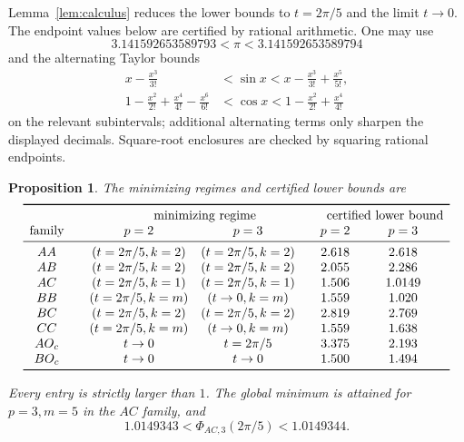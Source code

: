 \documentclass{amsart}
\newtheorem{prop}[lemma]{Proposition}
\newcommand{\tablegap}{\par\vspace{0.2cm}}
\begin{document}
Lemma~\ref{lem:calculus} reduces the lower bounds to \(t=2\pi/5\) and the
limit \(t\to0\).  The endpoint values below are certified by rational
arithmetic.  One may use
\[
 3.141592653589793<\pi<3.141592653589794
\]
and the alternating Taylor bounds
\begin{align*}
 x-\frac{x^3}{3!}
 &<\sin x<
 x-\frac{x^3}{3!}+\frac{x^5}{5!},\\
 1-\frac{x^2}{2!}+\frac{x^4}{4!}-\frac{x^6}{6!}
 &<\cos x<
 1-\frac{x^2}{2!}+\frac{x^4}{4!}
\end{align*}
on the relevant subintervals; additional alternating terms only sharpen
the displayed decimals.  Square-root enclosures are checked by squaring
rational endpoints.

\begin{prop}\label{prop:endpoints}
The minimizing regimes and certified lower bounds are
\begingroup
\small
\[
\begin{array}{c@{\qquad}cc@{\qquad}cc}
\toprule
&\multicolumn{2}{c}{\text{minimizing regime}}
&\multicolumn{2}{c}{\text{certified lower bound}}\\
\text{family}&p=2&p=3&p=2&p=3\\
\midrule
AA&(t=2\pi/5,k=2)&(t=2\pi/5,k=2)&2.618&2.618\\
AB&(t=2\pi/5,k=2)&(t=2\pi/5,k=2)&2.055&2.286\\
AC&(t=2\pi/5,k=1)&(t=2\pi/5,k=1)&1.506&1.0149\\
BB&(t=2\pi/5,k=m)&(t\to0,k=m)&1.559&1.020\\
BC&(t=2\pi/5,k=2)&(t=2\pi/5,k=2)&2.819&2.769\\
CC&(t=2\pi/5,k=m)&(t\to0,k=m)&1.559&1.638\\
AO_c&t\to0&t=2\pi/5&3.375&2.193\\
BO_c&t\to0&t\to0&1.500&1.494\\
\bottomrule
\end{array}
\]
\endgroup
\tablegap
Every entry is strictly larger than \(1\).  The global minimum is attained
for \(p=3,m=5\) in the \(AC\) family, and
\[
 1.0149343<\Phi_{AC,3}(2\pi/5)<1.0149344.
\]
\end{prop}
\end{document}
